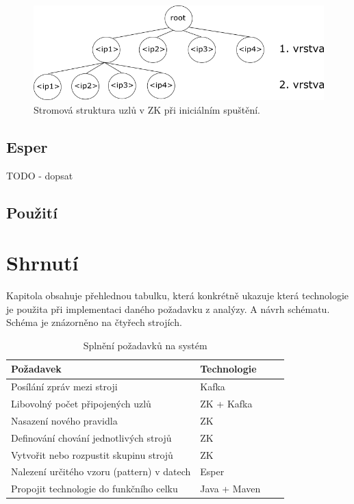\documentclass[
  digital, %
  table,   %
  nolof,     %
  nolot,     %
  oneside, %
  nocover,
  monochrome,
  12pt
]{fithesis3}
\begin{document}
\begin{figure}[H]
	\centering
    \includegraphics[width=1\textwidth, height=0.22\textheight]{images/zookeeper-impl.png}
    \caption{Stromová struktura uzlů v ZK při iniciálním spuštění.}
    \label{fig:zookeeper-impl}
\end{figure}

\subsection{Esper}
\label{sec:esper}
TODO - dopsat

\subsection*{Použití}

\section{Shrnutí}
Kapitola obsahuje přehlednou tabulku, která konkrétně ukazuje která technologie je použita při implementaci daného požadavku z analýzy. A návrh schématu. Schéma je znázorněno na čtyřech strojích.

\begin{table}[H]
  \centering
  \begin{tabularx}{\textwidth}{lllX}
    \toprule
    Požadavek & Technologie \\
    \midrule
    Posílání zpráv mezi stroji & Kafka \\
    Libovolný počet připojených uzlů & ZK + Kafka \\
    Nasazení nového pravidla & ZK \\
    Definování chování jednotlivých strojů & ZK \\
    Vytvořit nebo rozpustit skupinu strojů & ZK \\
    Nalezení určitého vzoru (pattern) v datech & Esper \\
    Propojit technologie do funkčního celku & Java + Maven \\
    \bottomrule
  \end{tabularx}
  \caption{Splnění požadavků na systém}
  \label{tab:fulfill-usecases}
\end{table}
\end{document}
